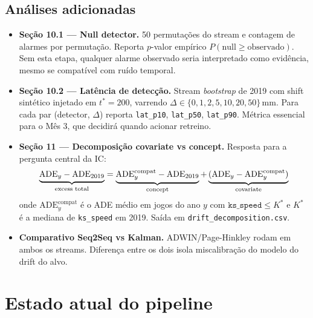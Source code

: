 \documentclass[11pt,a4paper]{article}
\begin{document}
\subsection{An\'alises adicionadas}

\begin{itemize}[leftmargin=1.4em,itemsep=2pt]
    \item \textbf{Se\c{c}\~ao 10.1 --- Null detector.} 50 permuta\c{c}\~oes
          do stream e contagem de alarmes por permuta\c{c}\~ao. Reporta
          $p$-valor emp\'irico $P(\text{null} \geq \text{observado})$.
          Sem esta etapa, qualquer alarme observado seria interpretado
          como evid\^encia, mesmo se compat\'ivel com ru\'ido temporal.
    \item \textbf{Se\c{c}\~ao 10.2 --- Lat\^encia de detec\c{c}\~ao.} Stream
          \emph{bootstrap} de 2019 com shift sint\'etico injetado em
          $t^* = 200$, varrendo
          $\Delta \in \{0, 1, 2, 5, 10, 20, 50\}$\,mm. Para cada par
          (detector, $\Delta$) reporta \texttt{lat\_p10}, \texttt{lat\_p50},
          \texttt{lat\_p90}. M\'etrica essencial para o M\^es 3, que
          decidir\'a quando acionar retreino.
    \item \textbf{Se\c{c}\~ao 11 --- Decomposi\c{c}\~ao covariate vs
          concept.} Resposta para a pergunta central da IC:
          \begin{equation}
              \underbrace{\text{ADE}_y - \text{ADE}_{2019}}_{\text{excess total}}
              = \underbrace{\text{ADE}^{\text{compat}}_y - \text{ADE}_{2019}}_{\text{concept}}
              + \underbrace{(\text{ADE}_y - \text{ADE}^{\text{compat}}_y)}_{\text{covariate}}
              \notag
          \end{equation}
          onde $\text{ADE}^{\text{compat}}_y$ \'e o ADE m\'edio em jogos
          do ano $y$ com $\texttt{ks\_speed} \leq K^*$ e $K^*$ \'e a
          mediana de \texttt{ks\_speed} em 2019. Sa\'ida em
          \texttt{drift\_decomposition.csv}.
    \item \textbf{Comparativo Seq2Seq vs Kalman.} ADWIN/Page-Hinkley
          rodam em ambos os streams. Diferen\c{c}a entre os dois isola
          miscalibra\c{c}\~ao do modelo do drift do alvo.
\end{itemize}

\section{Estado atual do pipeline}
\end{document}
